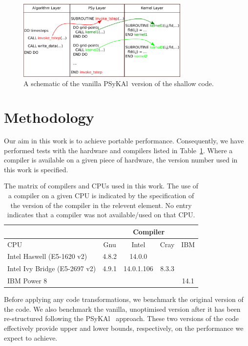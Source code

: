 \documentclass{IOS-Book-Article}
\newcommand{\psykal}{{PS}y{KA}l\ }
\begin{document}
\begin{figure}
\centering
\includegraphics[width=85mm]{../psykal_shallow}
\caption{A schematic of the vanilla \psykal version of the shallow code.}
\label{FIG_psykal_shallow_structure}
\end{figure}

\section{Methodology}

Our aim in this work is to achieve portable performance. Consequently,
we have performed tests with the hardware and compilers listed in
Table~\ref{TABLE_compilers}. Where a compiler is available on a given
piece of hardware, the version number used in this work is specified.

\begin{table}[!t]
\renewcommand{\arraystretch}{1.3}
\caption{The matrix of compilers and CPUs used in this work. The use
  of a compiler on a given CPU is indicated by the specification of
  the version of the compiler in the relevent element. No entry
  indicates that a compiler was not available/used on that CPU.}
\label{TABLE_compilers}
\centering
\begin{tabular}{|l|c|c|c|c|}
\hline
                 & \multicolumn{4}{c|}{Compiler}             \\
\hline
       CPU       & Gnu   & Intel       & Cray    & IBM     \\
\hline
Intel Haswell (E5-1620 v2)   & 4.8.2 & 14.0.0      &         & \\
Intel Ivy Bridge  (E5-2697 v2) & 4.9.1 & 14.0.1.106  & 8.3.3 & \\
IBM Power 8      &       &             &             & 14.1    \\
\hline
\end{tabular}
\end{table}

Before applying any code transformations, we benchmark the original
version of the code. We also benchmark the vanilla, unoptimised
version after it has been re-structured following the \psykal
approach. These two versions of the code effectively provide upper and
lower bounds, respectively, on the performance we expect to achieve.
\end{document}
